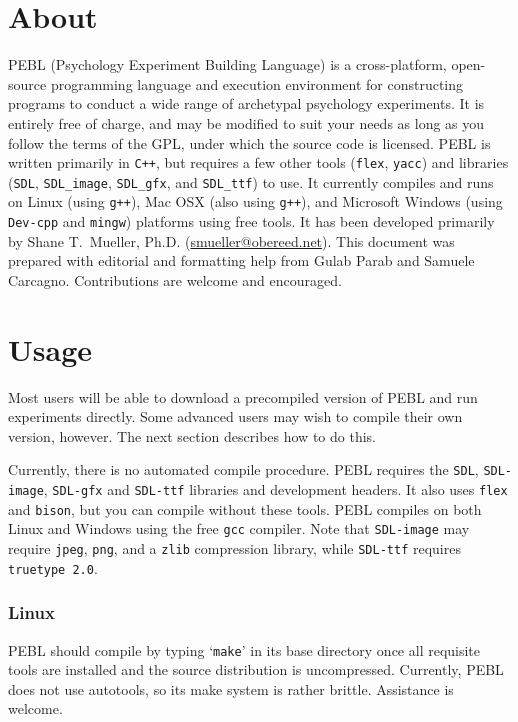 \chapter{About}

PEBL (Psychology Experiment Building Language) is a cross-platform,
open-source programming language and execution environment for
constructing programs to conduct a wide range of archetypal psychology
experiments. It is entirely free of charge, and may be modified to
suit your needs as long as you follow the terms of the GPL, under
which the source code is licensed. PEBL is written primarily in
\texttt{C++}, but requires a few other tools (\texttt{flex},
\texttt{yacc}) and libraries (\texttt{SDL}, \texttt{SDL\_image},
\texttt{SDL\_gfx}, and \texttt{SDL\_ttf}) to use. It currently
compiles and runs on Linux (using \texttt{g++}), Mac OSX (also using
\texttt{g++}), and Microsoft Windows (using \texttt{Dev-cpp} and
\texttt{mingw}) platforms using free tools. It has been developed
primarily by Shane T.~Mueller,
Ph.D. (\href{mailto:smueller@obereed.net}{smueller@obereed.net}). This
document was prepared with editorial and formatting help from Gulab
Parab and Samuele Carcagno. Contributions are welcome and encouraged.

\chapter{Usage}
Most users will be able to download a precompiled version of PEBL and
run experiments directly. Some advanced users may wish to compile
their own version, however.  The next section describes how to do this.


Currently, there is no automated compile procedure.  PEBL requires the
\texttt{SDL}, \texttt{SDL-image}, \texttt{SDL-gfx} and
\texttt{SDL-ttf} libraries and development headers.  It also uses
\texttt{flex} and \texttt{bison}, but you can compile without these
tools. PEBL compiles on both Linux and Windows using the free
\texttt{gcc} compiler. Note that \texttt{SDL-image} may require
\texttt{jpeg}, \texttt{png}, and a \texttt{zlib} compression library,
while \texttt{SDL-ttf} requires \texttt{truetype 2.0}.

\subsection{Linux}

PEBL should compile by typing `\texttt{make}' in its base directory
once all requisite tools are installed and the source distribution is
uncompressed. Currently, PEBL does not use autotools, so its make
system is rather brittle. Assistance is welcome.

